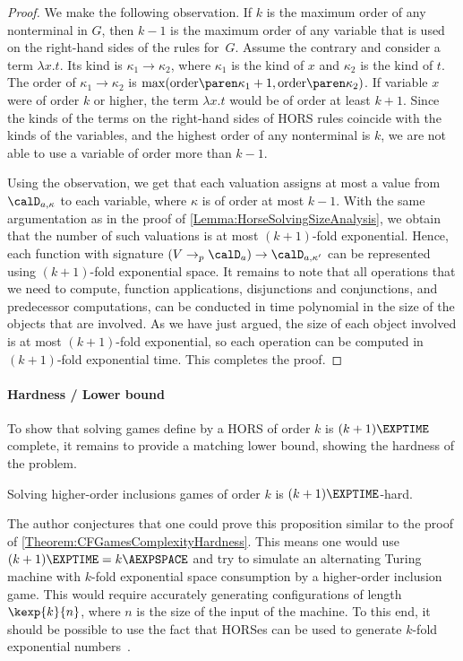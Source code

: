 \documentclass[../../diss.tex]{subfiles}
\begin{document}
\begin{proof}
    We make the following observation.
    If $k$ is the maximum order of any nonterminal in $G$, then $k-1$ is the maximum order of any variable that is used on the right-hand sides of the rules for~$G$.
    Assume the contrary and consider a term $\lambda x . t$.
    Its kind is $\kappa_1 \to \kappa_2$, where $\kappa_1$ is the kind of $x$ and $\kappa_2$ is the kind of $t$.
    The order of $\kappa_1 \to \kappa_2$ is $\max(\horsorder{\kappa_1} +1, \horsorder{\kappa_2})$.
    If variable $x$ were of order $k$ or higher, the term $\lambda x . t$ would be of order at least $k+1$.
    Since the kinds of the terms on the right-hand sides of HORS rules coincide with the kinds of the variables, and the highest order of any nonterminal is $k$, we are not able to use a variable of order more than $k-1$.

    Using the observation, we get that each valuation assigns at most a value from $\domaina{\kappa}$ to each variable, where $\kappa$ is of order at most $k-1$.
    With the same argumentation as in the proof of \cref{Lemma:HorseSolvingSizeAnalysis}, we obtain that the number of such valuations is at most $(k+1)$-fold exponential.
    Hence, each function with signature $(V \pto \domaina) \to \domaina{\kappa'}$ can be represented using $(k+1)$-fold exponential space.
    It remains to note that all operations that we need to compute, \eg function applications, disjunctions and conjunctions, and predecessor computations, can be conducted in time polynomial in the size of the objects that are involved.
    As we have just argued, the size of each object involved is at most $(k+1)$-fold exponential, so each operation can be computed in $(k+1)$-fold exponential time.
    This completes the proof.
\end{proof}

\paragraph{Hardness / Lower bound}

To show that solving games define by a HORS of order $k$ is $(k+1)\EXPTIME$ complete, it remains to provide a matching lower bound, showing the hardness of the problem.

\begin{proposition}%
\label{Proposition:HorseSolvingHardness}%
    Solving higher-order inclusions games of order $k$ is $(k+1)\EXPTIME$-hard.
\end{proposition}

The author conjectures that one could prove this proposition similar to the proof of \cref{Theorem:CFGamesComplexityHardness}.
This means one would use $(k+1)\EXPTIME = k\AEXPSPACE$ and try to simulate an alternating Turing machine with $k$-fold exponential space consumption by a higher-order inclusion game.
This would require accurately generating configurations of length $\kexp{k}{n}$, where $n$ is the size of the input of the machine.
To this end, it should be possible to use the fact that HORSes can be used to generate $k$-fold exponential numbers~\cite{CachatW07}.
\end{document}
